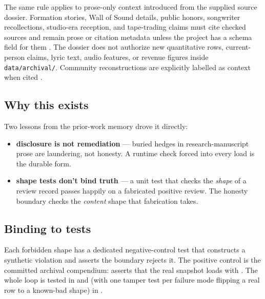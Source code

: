 \documentclass[
]{article}
\providecommand{\tightlist}{%
  \setlength{\itemsep}{0pt}\setlength{\parskip}{0pt}}
\begin{document}
The same rule applies to prose-only context introduced from the supplied
source dossier. Formation stories, Wall of Sound details, public honors,
songwriter recollections, studio-era reception, and tape-trading claims
must cite checked sources and remain prose or citation metadata unless
the project has a schema field for them
\citep{dead_net_biography, foundsf_weir_psychedelic_sf, mcintosh_wall_of_sound, kennedy_center_honors_2024, marshall_bootleg_collectors, rolling_stone_robert_hunter_interview, americana_highways_workingmans_american_beauty}.
The dossier does not authorize new quantitative rows, current-person
claims, lyric text, audio features, or revenue figures inside
\texttt{data/archival/}. Community reconstructions are explicitly
labelled as context when cited
\citep{grateful_seconds_touring_revenues}.

\subsection{Why this exists}\label{why-this-exists}

Two lessons from the prior-work memory drove it directly:

\begin{itemize}
\tightlist
\item
  \textbf{disclosure is not remediation} --- buried hedges in
  research-manuscript prose are laundering, not honesty. A runtime check
  forced into every load is the durable form.
\item
  \textbf{shape tests don't bind truth} --- a unit test that checks the
  \emph{shape} of a review record passes happily on a fabricated
  positive review. The honesty boundary checks the \emph{content} shape
  that fabrication takes.
\end{itemize}

\subsection{Binding to tests}\label{binding-to-tests}

Each forbidden shape has a dedicated negative-control test that
constructs a synthetic violation and asserts the boundary rejects it.
The positive control is the committed archival compendium:
 asserts that the real
snapshot loads with . The whole loop is
tested in  and (with one tamper test per
failure mode flipping a real row to a known-bad shape) in
.
\end{document}
